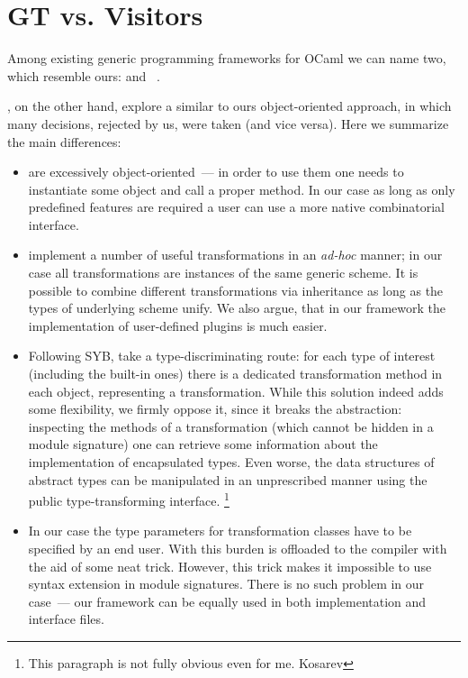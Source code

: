 \section{GT vs. Visitors}

Among existing generic programming frameworks for OCaml we can name two, which resemble ours:  and ~\cite{Visitors}.

, on the other hand, explore a similar to ours object-oriented approach, in which many decisions, rejected by us, were taken (and vice versa). Here
we summarize the main differences:

\begin{itemize}
   \item {} are excessively object-oriented~--- in order to use them one needs to instantiate some object and call a proper method. In our case as long as
     only predefined features are required a user can use a more native combinatorial interface.
     
   \item {} implement a number of useful transformations in an \emph{ad-hoc} manner; in our case all transformations are instances of the
     same generic scheme. It is possible to combine different transformations via inheritance as long as the types of underlying scheme unify. We also argue, that
     in our framework the implementation of user-defined plugins is much easier.
     
   \item Following SYB,  take a type-discriminating route: for each type of interest (including the built-in ones) there is a dedicated
     transformation method in each object, representing a transformation. While this solution indeed adds some flexibility, we firmly oppose it, since it
     breaks the abstraction: inspecting the methods of a transformation (which cannot be hidden in a module signature) one can retrieve some
     information about the implementation of encapsulated types. Even worse, the data structures of abstract types can be manipulated in an unprescribed
     manner using the public type-transforming interface.
     \footnote{This paragraph is not fully obvious even for me. Kosarev}

   \item In our case the type parameters for transformation classes have to be specified by an end user. With  this burden is offloaded to the
     compiler with the aid of some neat trick. However, this trick makes it impossible to use  syntax extension in module signatures. There is no
     such problem in our case~--- our framework can be equally used in both implementation and interface files.


\end{itemize}
